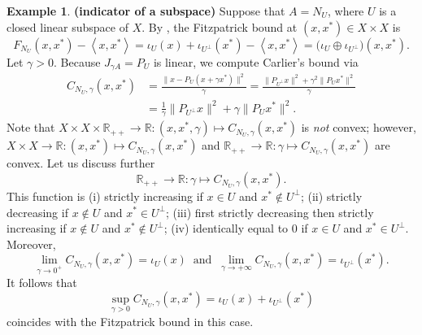 \documentclass[12pt]{article}
\newcommand{\scal}[2]{\left\langle{#1},{#2}  \right\rangle}
\newcommand{\RR}{\ensuremath{\mathbb R}}
\newcommand{\RPP}{\ensuremath{\mathbb{R}_{++}}}
\newcommand{\pinf}{\ensuremath{+\infty}}
\theoremstyle{definition}
\newtheorem{example}[theorem]{Example}
\providecommand{\RR}{\mathbb{R}}
\providecommand{\RR}{\mathbb{R}}
\begin{document}
{\begin{example} {\bf (indicator of a subspace)} 
Suppose that $A=N_U$, where $U$ is a closed linear subspace of $X$.
By \cite[Example~3.1]{BMS}, the Fitzpatrick bound at $(x,x^*)\in X\times X$ is 
\begin{equation}
F_{N_U}(x,x^*) -\scal{x}{x^*}= \iota_U(x) + \iota_{U^\perp}(x^*)-\scal{x}{x^*} 
= \big(\iota_U \oplus \iota_{U^\perp}\big)(x,x^*). 
\end{equation}
Let $\gamma>0$. Because $J_{\gamma A}=P_U$ is linear, we compute 
Carlier's bound via
\begin{subequations}
\begin{align}
C_{N_U,\gamma}(x,x^*)
&= \frac{\|x-P_{U}(x+\gamma x^*)\|^2}{\gamma}
= \frac{\|P_{U^\perp}x\|^2+\gamma^2\|P_Ux^*\|^2}{\gamma}\\
&= \frac{1}{\gamma}\|P_{U^\perp}x\|^2 + \gamma\|P_Ux^*\|^2.
\end{align}
\end{subequations}
Note that $X\times X\times \RPP\to\RR\colon (x,x^*,\gamma)\mapsto C_{N_U,\gamma}(x,x^*)$ is 
\emph{not} convex; however, 
$X\times X\to\RR\colon (x,x^*)\mapsto C_{N_U,\gamma}(x,x^*)$ 
and 
$\RPP\to\RR\colon \gamma\mapsto C_{N_U,\gamma}(x,x^*)$ are convex. 
Let us discuss further 
\begin{equation}
\RPP\to\RR\colon \gamma\mapsto C_{N_U,\gamma}(x,x^*).
\end{equation}
This function is 
(i) strictly increasing if $x\in U$ and $x^*\notin U^\perp$;
(ii) strictly decreasing if $x\notin U$ and $x^*\in U^\perp$;
(iii) first strictly decreasing then strictly increasing if
$x\notin U$ and $x^*\notin U^\perp$; 
(iv) identically equal to $0$ if $x\in U$ and $x^*\in U^\perp$. 
Moreover,
\begin{equation}
\lim_{\gamma\to 0^+} C_{N_U,\gamma}(x,x^*) = \iota_U(x)
\;\;\text{and}\;\;
\lim_{\gamma\to \pinf} C_{N_U,\gamma}(x,x^*) = \iota_{U^\perp}(x^*). 
\end{equation}
It follows that 
\begin{equation}
\sup_{\gamma>0} C_{N_U,\gamma}(x,x^*)=\iota_U(x)+\iota_{U^\perp}(x^*)
\end{equation}
coincides with the Fitzpatrick bound in this case. 
\end{example}

}
\end{document}
